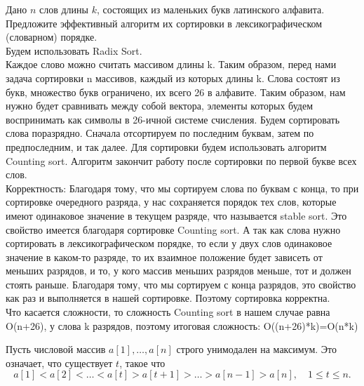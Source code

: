 \documentclass[12pt]{extreport}
\theoremstyle{definiton}
\theoremstyle{definition}
\theoremstyle{definition}
\let\leq\leqslant
\begin{document}
	
	

	\Pr[2] Дано $n$ слов длины $k$, состоящих из маленьких букв латинского алфавита. Предложите эффективный алгоритм их сортировки в лексикографическом (словарном) порядке.
	\newline
	\\ Будем использовать Radix Sort.
	\\ Каждое слово можно считать массивом длины k. Таким образом, перед нами задача сортировки n массивов, каждый из которых длины k. Слова состоят из букв, множество букв ограничено, их всего 26 в алфавите. Таким образом, нам нужно будет сравнивать между собой вектора, элементы которых будем воспринимать как символы в 26-ичной системе счисления. Будем сортировать слова поразрядно. Сначала отсортируем по последним буквам, затем по предпоследним, и так далее. Для сортировки будем использовать алгоритм Counting sort. Алгоритм закончит работу после сортировки по первой букве всех слов.
	\\Корректность: Благодаря тому, что мы сортируем слова по буквам с конца, то при сортировке очередного разряда, у нас сохраняется порядок тех слов, которые имеют одинаковое значение в текущем разряде, что называется stable sort. Это свойство имеется благодаря сортировке Counting sort. А так как слова нужно сортировать в лексикографическом порядке, то если у двух слов одинаковое значение в каком-то разряде, то их взаимное положение будет зависеть от меньших разрядов, и то, у кого массив меньших разрядов меньше, тот и должен стоять раньше. Благодаря тому, что мы сортируем с конца разрядов, это свойство как раз и выполняется в нашей сортировке. Поэтому сортировка корректна.
	\\ Что касается сложности, то сложность Counting sort в нашем случае равна O(n+26), у слова k разрядов, поэтому итоговая сложность: O((n+26)*k)=O(n*k)

	\Pr[3] Пусть числовой массив $a[1],\dots,a[n]$ строго унимодален на максимум. Это означает, что существует $t$, такое что
	$$
	a[1]<a[2]<\dots< a[t]> a[t+1]>\dots> a[n-1]> a[n],
	\quad 1\leq t\leq n.
	$$
\end{document}
